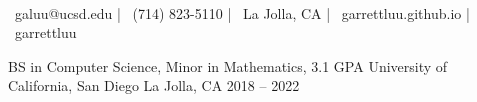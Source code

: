 \documentclass[]{awesome-cv}
\begin{document}
\begin{center}
	\vspace{-5mm}
	  \\
	\vspace{2mm}
  {\faEnvelope\ galuu@ucsd.edu} | {\faMobile\ (714) 823-5110} |
  {\faMapMarker\ La Jolla, CA} | {\faLink\ garrettluu.github.io} |
  {\faLinkedinSquare\ garrettluu}
\end{center}
\vspace{-3mm}
\begin{cventries}
	\cventry
	{BS in Computer Science, Minor in Mathematics, 3.1 GPA}
	{University of California, San Diego}
	{La Jolla, CA}
	{2018 – 2022}
	{}
\end{cventries}
\end{document}
